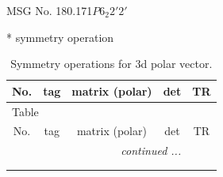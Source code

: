 \documentclass[fleqn,8pt]{jsarticle}
\begin{document}
\setcounter{MaxMatrixCols}{32}

\renewcommand{\tablename}{Table~}
\renewcommand{\figurename}{Figure~}
\begin{center}
\LARGE
MSG No. 180.171\quad$P6_{2}2'2'$
\end{center}
* symmetry operation
\renewcommand{\arraystretch}{1.3}
\begin{longtable}{ccccc}
\caption{Symmetry operations for 3d polar vector.}
 \\
 \hline \hline
No. & tag & matrix (polar) & det & TR \\ \hline \endfirsthead

\multicolumn{4}{l}{\tablename\ \thetable{}} \\
 \hline \hline
No. & tag & matrix (polar) & det & TR \\ \hline \endhead

 \hline \hline
\multicolumn{4}{r}{\footnotesize\it continued ...} \\ \endfoot

 \hline \hline
\multicolumn{4}{r}{} \\ \endlastfoot


\end{longtable}
\end{document}
